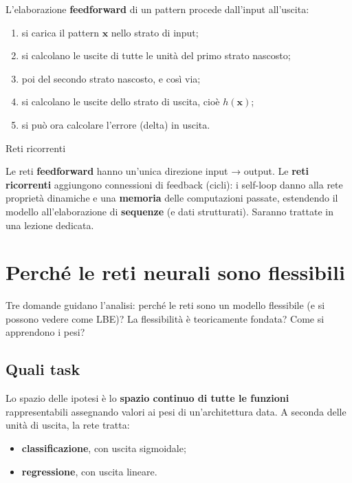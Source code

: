L'elaborazione \textbf{feedforward} di un pattern procede dall'input
all'uscita:

\begin{enumerate}
\def\labelenumi{\arabic{enumi}.}
\tightlist
\item
  si carica il pattern \(\mathbf{x}\) nello strato di input;
\item
  si calcolano le uscite di tutte le unità del primo strato nascosto;
\item
  poi del secondo strato nascosto, e così via;
\item
  si calcolano le uscite dello strato di uscita, cioè \(h(\mathbf{x})\);
\item
  si può ora calcolare l'errore (delta) in uscita.
\end{enumerate}

\begin{boxnote}{Reti ricorrenti}

Le reti \textbf{feedforward} hanno un'unica direzione input → output. Le
\textbf{reti ricorrenti} aggiungono connessioni di feedback (cicli): i
self-loop danno alla rete proprietà dinamiche e una \textbf{memoria}
delle computazioni passate, estendendo il modello all'elaborazione di
\textbf{sequenze} (e dati strutturati). Saranno trattate in una lezione
dedicata.

\end{boxnote}

\section{Perché le reti neurali sono
flessibili}\label{perchuxe9-le-reti-neurali-sono-flessibili}

Tre domande guidano l'analisi: perché le reti sono un modello flessibile
(e si possono vedere come LBE)? La flessibilità è teoricamente fondata?
Come si apprendono i pesi?

\subsection{Quali task}\label{quali-task}

Lo spazio delle ipotesi è lo \textbf{spazio continuo di tutte le
funzioni} rappresentabili assegnando valori ai pesi di un'architettura
data. A seconda delle unità di uscita, la rete tratta:

\begin{itemize}
\tightlist
\item
  \textbf{classificazione}, con uscita sigmoidale;
\item
  \textbf{regressione}, con uscita lineare.
\end{itemize}

